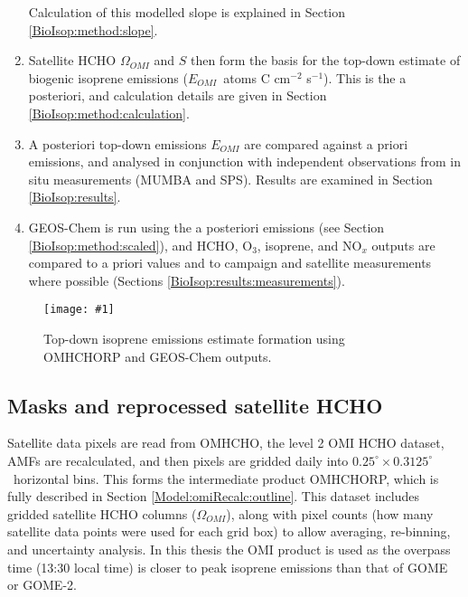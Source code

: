 \documentclass[acp, manuscript]{copernicus}
\newcommand{\Oomi}{\Omega_{OMI}} %
\newcommand{\apost}{E_{OMI}} %
\newcommand{\highhr}{$0.25^{\circ} \times 0.3125^{\circ}$}
\newcommand{\mypic}[3]{%
  \begin{figure}
    \texttt{[image: \#1]}
    \caption{#2}
    #3
  \end{figure}
}
\begin{document}
\begin{enumerate}
        Calculation of this modelled slope is explained in Section \ref{BioIsop:method:slope}.
      \item 
        Satellite HCHO $\Oomi$ and $S$ then form the basis for the top-down estimate of biogenic isoprene emissions ($\apost$~atoms C cm$^{-2}$ s$^{-1}$).
        This is the a posteriori, and calculation details are given in Section \ref{BioIsop:method:calculation}.
      \item 
        A posteriori top-down emissions $\apost$ are compared against a priori emissions, and analysed in conjunction with independent observations from in situ measurements (MUMBA and SPS).
        Results are examined in Section \ref{BioIsop:results}.
      \item 
        GEOS-Chem is run using the a posteriori emissions (see Section \ref{BioIsop:method:scaled}), and HCHO, O$_3$, isoprene, and NO$_x$ outputs are compared to a priori values and to campaign and satellite measurements where possible (Sections \ref{BioIsop:results:measurements}).
    \end{enumerate}
    
    \mypic{Figures/TopDownCreation.png}{%
      Top-down isoprene emissions estimate formation using OMHCHORP and GEOS-Chem outputs.
    }{\label{BioIsop:method:fig_Flow_Making_Isop}}
  
  \subsection{Masks and reprocessed satellite HCHO}
    
    Satellite data pixels are read from OMHCHO, the level 2 OMI HCHO dataset, AMFs are recalculated, and then pixels are gridded daily into \highhr ~horizontal bins. 
    This forms the intermediate product OMHCHORP, which is fully described in Section \ref{Model:omiRecalc:outline}.
    This dataset includes gridded satellite HCHO columns ($\Oomi$), along with pixel counts (how many satellite data points were used for each grid box) to allow averaging, re-binning, and uncertainty analysis.
    In this thesis the OMI product is used 
    as the overpass time (13:30 local time) is closer to peak isoprene emissions than that of GOME or GOME-2. %
    
\end{document}
